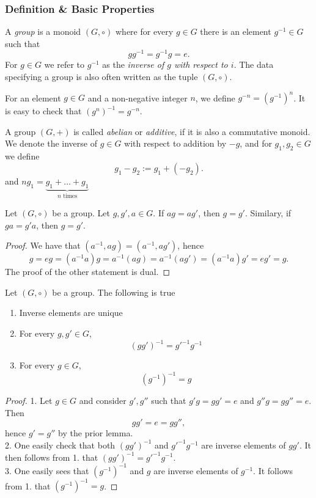 \subsubsection{Definition \& Basic Properties}
\begin{definition}
    A \textit{group} is a monoid $(G,\circ)$ where for every $g\in G$ there is an element $g^{-1}\in G$ such that
    $$gg^{-1}=g^{-1}g = e.$$
    For $g\in G$ we refer to $g^{-1}$ as the \textit{inverse of $g$ with respect to $i$}. The data specifying a group is also often written as the tuple $(G,\circ)$.
\end{definition}
\begin{remark}
    For an element $g\in G$ and a non-negative integer $n$, we define $g^{-n} = \left(g^{-1}\right)^n$. It is easy to check that $\left( g^n\right)^{-1}=g^{-n}$.
\end{remark}
\begin{definition}
    A group $(G,+)$ is called \textit{abelian} or \textit{additive}, if it is also a commutative monoid. We denote the inverse of $g\in G$ with respect to addition by $-g$, and for $g_1,g_2\in G$ we define 
    $$g_1-g_2 := g_1+(-g_2).$$
    and $ng_1 = \underbrace{g_1+\dots + g_1}_{n\text{ times}}$
\end{definition}
\begin{lemma}\label{LeftAndRightMultiplicationIsInjective}
    Let $(G,\circ)$ be a group. Let $g,g',a\in G$. If $ag = ag'$, then $g=g'$. Similary, if $ga=g'a$, then $g=g'$.
\end{lemma}
\begin{proof}
    We have that $(a^{-1},ag)=(a^{-1},ag')$, hence 
    $$g = eg = (a^{-1}a)g = a^{-1}(ag) = a^{-1}(ag') = (a^{-1}a)g' = eg' = g.$$
    The proof of the other statement is dual. 
\end{proof}
\begin{lemma}\label{InverseElementResults}
    Let $(G,\circ)$ be a group. The following is true
    \begin{enumerate}
        \item Inverse elements are unique
        \item For every $g,g'\in G$,
        $$(gg')^{-1} = g'^{-1}g^{-1}$$
        \item For every $g\in G$, 
        $$(g^{-1})^{-1} = g$$
    \end{enumerate}
\end{lemma}
\begin{proof}
    1. Let $g\in G$ and consider $g',g''$ such that $g'g=gg'=e$ and $g''g=gg''=e$. Then 
    $$gg' = e = gg'',$$
    hence $g' =g''$ by the prior lemma.\\ 
    2. One easily check that both $(gg')^{-1}$ and $g'^{-1}g^{-1}$ are inverse elements of $gg'$. It then follows from 1. that $(gg')^{-1} = g'^{-1}g^{-1}$.\\
    3. 
    One easily sees that $\left(g^{-1}\right)^{-1}$ and $g$ are inverse elements of $g^{-1}$. It follows from 1. that $\left(g^{-1}\right)^{-1}=g$.
\end{proof}
